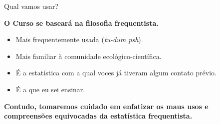 \documentclass{beamer}\usepackage[]{graphicx}\usepackage[]{color}
\begin{document}
\begin{frame}{Qual vamos usar?}

\textbf{O Curso se baseará na filosofia frequentista.}

\begin{itemize}

\item Mais frequentemente usada (\emph{tu-dum psh}).

\item Mais familiar à comunidade ecológico-científica.

\item É a estatística com a qual voces já tiveram algum contato prévio.

\item É a que eu sei ensinar.

\end{itemize}

\textbf{Contudo, tomaremos cuidado em enfatizar os maus usos e compreensões equivocadas da estatística frequentista.}
  
  
\end{frame}
\end{document}
